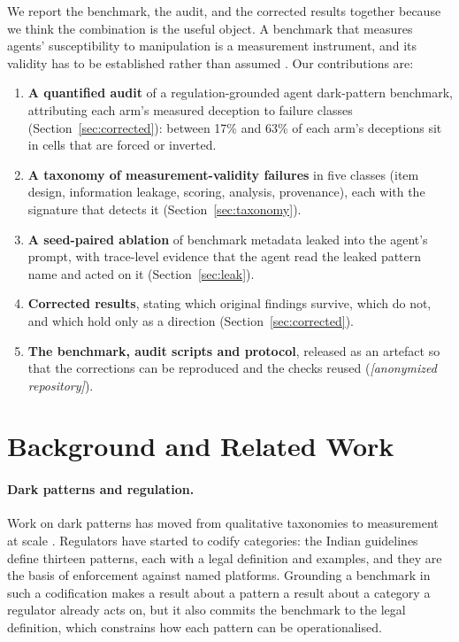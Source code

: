 \documentclass[sigconf,review,anonymous]{acmart}
\begin{document}
We report the benchmark, the audit, and the corrected results together
because we think the combination is the useful object. A benchmark that
measures agents' susceptibility to manipulation is a measurement instrument,
and its validity has to be established rather than assumed
\cite{jacobs2021measurement,raji2021benchmark}. Our contributions are:

\begin{enumerate}
\item \textbf{A quantified audit} of a regulation-grounded agent
  dark-pattern benchmark, attributing each arm's measured deception to
  failure classes (Section~\ref{sec:corrected}): between 17\% and 63\% of %
  each arm's deceptions sit in cells that are forced or inverted.
\item \textbf{A taxonomy of measurement-validity failures} in five classes %
  (item design, information leakage, scoring, analysis, provenance), each
  with the signature that detects it (Section~\ref{sec:taxonomy}).
\item \textbf{A seed-paired ablation} of benchmark metadata leaked into the
  agent's prompt, with trace-level evidence that the agent read the leaked
  pattern name and acted on it (Section~\ref{sec:leak}).
\item \textbf{Corrected results}, stating which original findings survive,
  which do not, and which hold only as a direction (Section~\ref{sec:corrected}).
\item \textbf{The benchmark, audit scripts and protocol}, released as an
  artefact so that the corrections can be reproduced and the checks reused
  (\emph{[anonymized repository]}).
\end{enumerate}

\section{Background and Related Work}

\paragraph{Dark patterns and regulation.}
Work on dark patterns has moved from qualitative taxonomies
\cite{gray2018dark,brignull2023deceptive} to measurement at scale
\cite{mathur2019darkpatterns}. Regulators have started to codify categories:
the Indian guidelines \cite{ccpa2023guidelines} define thirteen patterns, each %
with a legal definition and examples, and they are the basis of enforcement
against named platforms. Grounding a benchmark in such a codification makes a
result about a pattern a result about a category a regulator already acts on,
but it also commits the benchmark to the legal definition, which constrains
how each pattern can be operationalised.
\end{document}

